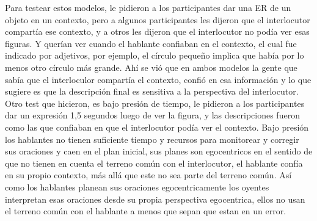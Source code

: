 Para testear estos modelos, le pidieron a los participantes dar una ER de un objeto en un contexto, pero a algunos participantes les dijeron que el interlocutor compart\'ia ese contexto, y a otros les dijeron que el interlocutor no pod\'ia ver esas figuras. Y quer\'ian ver cuando el hablante confiaban en el contexto, el cual fue indicado por adjetivos, por ejemplo, el c\'irculo peque\~no implica que hab\'ia por lo menos otro c\'irculo m\'as grande. Ah\'i se vi\'o que en ambos modelos la gente que sab\'ia que el interloculor compart\'ia el contexto, confi\'o en esa informaci\'on y lo que sugiere es que la descripci\'on final es sensitiva a la perspectiva del interlocutor. Otro test que hicieron, es bajo presi\'on de tiempo, le pidieron a los participantes dar un expresi\'on 1,5 segundos luego de ver la figura, y las descripciones fueron como las que confiaban en que el interlocutor pod\'ia ver el contexto. Bajo presi\'on los hablantes no tienen suficiente tiempo y recursos para monitorear y corregir sus oraciones y caen en el plan inicial, sus planes son egocentricos en el sentido de que no tienen en cuenta el terreno com\'un con el interlocutor, el hablante conf\'ia en su propio contexto, m\'as all\'a que este no sea parte del terreno com\'un. As\'i como los hablantes planean sus oraciones egocentricamente los oyentes interpretan esas oraciones desde su propia perspectiva egocentrica, ellos no usan el terreno com\'un con el hablante a menos que sepan que estan en un error.



